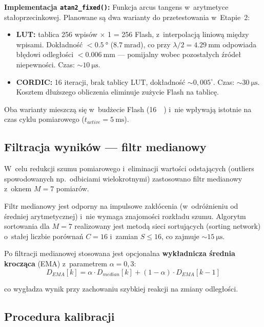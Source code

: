\documentclass[a4paper,11pt]{article}
\begin{document}
	\textbf{Implementacja \texttt{atan2\_fixed()}:} Funkcja arcus tangens
	w~arytmetyce stałoprzecinkowej. Planowane są dwa warianty do przetestowania
	w~Etapie~2:
	
	\begin{itemize}[nosep]
		\item \textbf{LUT:} tablica 256 wpisów $\times$ \SI{1}{\byte}
		= \SI{256}{\byte} Flash, z~interpolacją liniową między wpisami.
		Dokładność $< \SI{0,5}{\degree}$ ($\SI{8,7}{\milli\radian}$),
		co przy $\lambda/2 = \SI{4,29}{\milli\metre}$ odpowiada błędowi
		odległości $< \SI{0,006}{\milli\metre}$ --- pomijalny wobec
		pozostałych źródeł niepewności. Czas: ${\sim}\SI{10}{\micro\second}$.
		\item \textbf{CORDIC:} 16 iteracji, brak tablicy LUT, dokładność
		${\sim}0{,}005^{\circ}$. Czas: ${\sim}\SI{30}{\micro\second}$.
		Kosztem dłuższego obliczenia eliminuje zużycie Flash na tablicę.
	\end{itemize}
	
	Oba warianty mieszczą się w~budżecie Flash (\SI{16}{\kilo\byte}) i~nie wpływają
	istotnie na czas cyklu pomiarowego ($t_{active} = \SI{5}{\milli\second}$).
	
	\subsection{Filtracja wyników --- filtr medianowy}
	\label{sec:filtr}
	
	W~celu redukcji szumu pomiarowego i~eliminacji wartości odstających (outliers
	spowodowanych np.\ odbiciami wielokrotnymi) zastosowano filtr medianowy
	z~oknem $M = 7$ pomiarów.
	
	Filtr medianowy jest odporny na impulsowe zakłócenia (w~odróżnieniu od średniej
	arytmetycznej) i~nie wymaga znajomości rozkładu szumu. Algorytm sortowania
	dla $M = 7$ realizowany jest metodą sieci sortujących (sorting network) o~stałej
	liczbie porównań $C = 16$ i~zamian $S \leq 16$, co zajmuje ${\sim}\SI{15}{\micro\second}$.
	
	Po filtracji medianowej stosowana jest opcjonalna \textbf{wykładnicza średnia
		krocząca} (EMA) z~parametrem $\alpha = 0{,}3$:
	\begin{equation}
		D_{EMA}[k] = \alpha \cdot D_{median}[k] + (1-\alpha) \cdot D_{EMA}[k-1]
		\label{eq:ema}
	\end{equation}
	
	co wygładza wynik przy zachowaniu szybkiej reakcji na zmiany odległości.
	
	\subsection{Procedura kalibracji}
	\label{sec:kalibracja}
	
\end{document}
